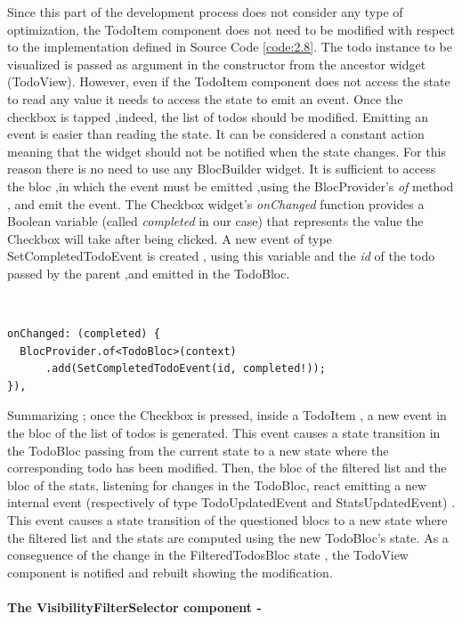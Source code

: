 Since this part of the development process does not consider any type of optimization, the TodoItem component does not need to be modified with respect to the implementation defined in Source Code \ref{code:2.8}. The todo instance to be visualized is passed as argument in the constructor from the ancestor widget (TodoView). However, even if the TodoItem component does not access the state to read any value it needs to access the state to emit an event. Once the checkbox is tapped ,indeed, the list of todos should be modified. Emitting an event is easier than reading the state. It can be considered a constant action meaning that the widget should not be notified when the state changes. For this reason there is no need to use any BlocBuilder widget. It is sufficient to access the bloc ,in which the event must be emitted ,using the BlocProvider’s \textit{of} method , and emit the event. The Checkbox widget’s \textit{onChanged} function provides a Boolean variable (called \textit{completed} in our case) that represents the value the Checkbox will take after being clicked.  A new event of type SetCompletedTodoEvent is created , using this variable and the \textit{id} of the todo passed by the parent ,and emitted in the TodoBloc.
\begin{code}
\mbox{}\\
 \mbox{}
\label{code:2.14}
\begin{verbatim}
onChanged: (completed) {
  BlocProvider.of<TodoBloc>(context)
      .add(SetCompletedTodoEvent(id, completed!));
}),
\end{verbatim}
\mbox{}
\end{code}

Summarizing ;  once the Checkbox is pressed, inside a TodoItem , a new event in the bloc of the list of todos is generated. This event causes a state transition in the TodoBloc passing from the current state to a new state where the corresponding todo has been modified. Then, the bloc of the filtered list and the bloc of the stats, listening for changes in the TodoBloc, react emitting a new internal event (respectively of type TodoUpdatedEvent and StatsUpdatedEvent) . This event causes a state transition of the questioned blocs to a new state where the filtered list and the stats are computed using the new TodoBloc’s state. As a conseguence of the change in the FilteredTodosBloc state , the TodoView component is notified and rebuilt showing the modification.
\paragraph{The VisibilityFilterSelector component - }
\label{subpar:todo_app_bloc_core_state}


